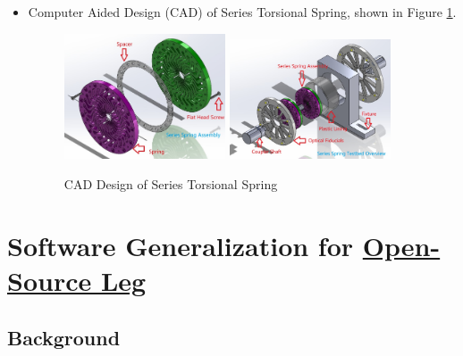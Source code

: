 \documentclass[12pt]{article}
\begin{document}
\begin{itemize}
    \item {Computer Aided Design (CAD) of Series Torsional Spring, shown in Figure \ref*{Series Spring CAD}}. 
    
                
    \begin{figure}[H]

        \centering
        \includegraphics[width=0.45\textwidth]{portfolio/SeriesASSEM_2in1.JPG}
        \includegraphics[width=0.45\textwidth]{portfolio/SeriesASSEM_4in1.JPG}
        \caption{CAD Design of Series Torsional Spring}
        \label{Series Spring CAD}

    \end{figure}

        

\end{itemize}




\newpage

\section{Software Generalization for \href{https://www.opensourceleg.org/}{Open-Source Leg}}


\subsection{Background}
\end{document}
